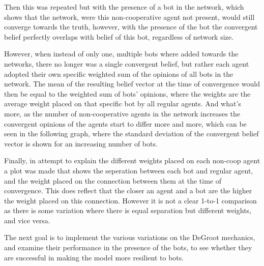 \documentclass{article}
\begin{document}
Then this was repeated but with the presence of a bot in the network, which shows that the network, were this non-cooperative agent not present, would still converge towards the truth, however, with the presence of the bot the convergent belief perfectly overlaps with belief of this bot, regardless of network size.

However, when instead of only one, multiple bots where added towards the networks, there no longer was a single convergent belief, but rather each agent adopted their own specific weighted sum of the opinions of all bots in the network. The mean of the resulting belief vector at the time of convergence would then be equal to the weighted sum of bots' opinions, where the weights are the average weight placed on that specific bot by all regular agents.
And what's more, as the number of non-cooperative agents in the network increases the convergent opinions of the agents start to differ more and more, which can be seen in the following graph, where the standard deviation of the convergent belief vector is shown for an increasing number of bots.

Finally, in attempt to explain the different weights placed on each non-coop agent a plot was made that shows the seperation between each bot and regular agent, and the weight placed on the connection between them at the time of convergence. This does reflect that the closer an agent and a bot are the higher the weight placed on this connection. However it is not a clear 1-to-1 comparison as there is some variation where there is equal separation but different weights, and vice versa.

The next goal is to implement the various variations on the DeGroot mechanics, and examine their performance in the presence of the bots, to see whether they are successful in making the model more resilient to bots.
\newpage
\end{document}
